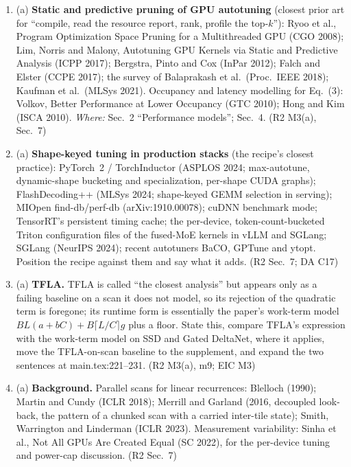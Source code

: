 \documentclass[11pt]{article}
\begin{document}
\begin{enumerate}[label=M9\alph*.]
  \item (a) \textbf{Static and predictive pruning of GPU autotuning} (closest
        prior art for ``compile, read the resource report, rank, profile the
        top-$k$''): Ryoo et al., Program Optimization Space Pruning for a
        Multithreaded GPU (CGO 2008); Lim, Norris and Malony, Autotuning GPU
        Kernels via Static and Predictive Analysis (ICPP 2017); Bergstra,
        Pinto and Cox (InPar 2012); Falch and Elster (CCPE 2017); the survey
        of Balaprakash et al.\ (Proc.\ IEEE 2018); Kaufman et al.\ (MLSys
        2021). Occupancy and latency modelling for Eq.~(3): Volkov, Better
        Performance at Lower Occupancy (GTC 2010); Hong and Kim (ISCA 2010).
        \emph{Where:} Sec.~2 ``Performance models''; Sec.~4. (R2 M3(a), Sec.~7)
  \item (a) \textbf{Shape-keyed tuning in production stacks} (the recipe's
        closest practice): PyTorch~2 / TorchInductor (ASPLOS 2024;
        max-autotune, dynamic-shape bucketing and specialization, per-shape
        CUDA graphs); FlashDecoding++ (MLSys 2024; shape-keyed GEMM selection
        in serving); MIOpen find-db/perf-db (arXiv:1910.00078); cuDNN
        benchmark mode; TensorRT's persistent timing cache; the per-device,
        token-count-bucketed Triton configuration files of the fused-MoE
        kernels in vLLM and SGLang; SGLang (NeurIPS 2024); recent autotuners
        BaCO, GPTune and ytopt. Position the recipe against them and say what
        it adds. (R2 Sec.~7; DA C17)
  \item (a) \textbf{TFLA.} TFLA is called ``the closest analysis'' but appears
        only as a failing baseline on a scan it does not model, so its
        rejection of the quadratic term is foregone; its runtime form is
        essentially the paper's work-term model $BL(a+bC)+B\lceil
        L/C\rceil g$ plus a floor. State this, compare TFLA's expression with
        the work-term model on SSD and Gated DeltaNet, where it applies, move
        the TFLA-on-scan baseline to the supplement, and expand the two
        sentences at main.tex:221--231. (R2 M3(a), m9; EIC M3)
  \item (a) \textbf{Background.} Parallel scans for linear recurrences:
        Blelloch (1990); Martin and Cundy (ICLR 2018); Merrill and Garland
        (2016, decoupled look-back, the pattern of a chunked scan with a
        carried inter-tile state); Smith, Warrington and Linderman (ICLR
        2023). Measurement variability: Sinha et al., Not All GPUs Are Created
        Equal (SC 2022), for the per-device tuning and power-cap discussion.
        (R2 Sec.~7)
\end{enumerate}
\end{document}
